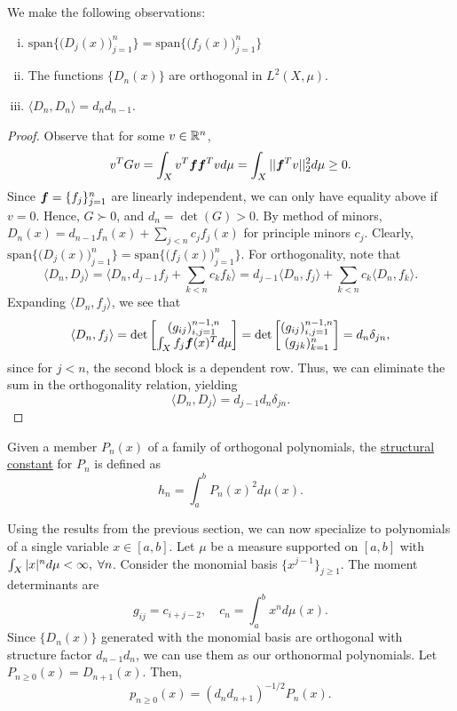 \begin{proposition}\label{prop:moments}\normalfont
We make the following observations:
\begin{enumerate}[(i)]
	\item $\text{span}\{\big(D_j(x)\big)_{j=1}^n\} = \text{span}\{\big(f_j(x)\big)_{j=1}^n\}$
	\item The functions $\{D_n(x)\}$ are orthogonal in $L^2(X,\mu)$.
	\item $\langle D_n,D_n\rangle = d_nd_{n-1}$.
\end{enumerate}
\end{proposition}
\begin{proof}
Observe that for some $v \in \mathbb{R}^n$,
$$ v^T G v = \int_{X} v^T \boldsymbol{f}\boldsymbol{f}^T v d\mu = \int_{X} ||\boldsymbol{f}^Tv||_2^2 d\mu \geq 0.$$
Since $\boldsymbol{f} = \{f_j\}_{j=1}^n$ are linearly independent, we can only have equality above if $v = 0$. Hence, $G \succ 0$, and $d_n = \det(G) > 0$. By method of minors, $D_n(x) = d_{n-1}f_n(x) + \sum_{j < n} c_j f_j(x)$ for principle minors $c_j$. Clearly, $\text{span}\{\big(D_j(x)\big)_{j=1}^n\} = \text{span}\{\big(f_j(x)\big)_{j=1}^n\}$. For orthogonality, note that $$\big\langle D_n,D_j\big\rangle = \big\langle D_n, d_{j-1}f_j + \sum_{k<n} c_k f_k\big\rangle = d_{j-1}\big\langle D_n,f_j\big\rangle+ \sum_{k<n}c_k\big\langle D_n,f_k\big\rangle.$$ Expanding $\langle D_n,f_j\rangle$, we see that $$\langle D_n,f_j\rangle = \det{
	\begin{bmatrix} (g_{ij})_{i,j = 1}^{n-1,n} \\ \int_{X}f_j\boldsymbol{f}(x)^Td\mu  \end{bmatrix}} = \det{
\begin{bmatrix} (g_{ij})_{i,j = 1}^{n-1,n} \\ (g_{jk})_{k=1}^n \end{bmatrix}} = d_n\delta_{jn},$$
since for $j < n$, the second block is a dependent row. Thus, we can eliminate the sum in the orthogonality relation, yielding $$\langle D_n,D_j\rangle = d_{j-1}d_n\delta_{jn}.$$
\end{proof}
\begin{definition}\normalfont
	Given a member $P_n(x)$ of a family of orthogonal polynomials, the \underline{structural constant} for $P_n$ is defined as
	\begin{equation}
	h_n = \int_a^b P_n(x)^2d\mu(x).
	\end{equation}
\end{definition}
\vspace{-10pt}
Using the results from the previous section, we can now specialize to polynomials of a single variable $x \in [a,b]$. Let $\mu$ be a measure supported on $[a,b]$ with $\int_{X}|x|^n d\mu < \infty,\; \forall n$. Consider the monomial basis $\{x^{j-1}\}_{j\geq 1}$. The moment determinants are $$g_{ij} = c_{i+j-2},\quad c_n = \int_{a}^b x^n d\mu(x).$$ Since $\{D_n(x)\}$ generated with the monomial basis are orthogonal with structure factor $d_{n-1}d_n$, we can use them as our orthonormal polynomials. Let $P_{n\geq0}(x) = D_{n+1}(x)$. Then,
\begin{equation}
p_{n\geq 0}(x) = (d_nd_{n+1})^{-1/2}P_{n}(x).
\end{equation}

